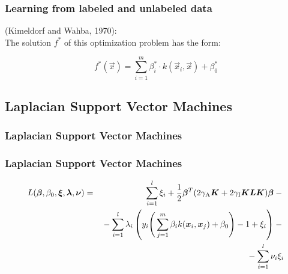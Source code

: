   
\begin{frame}
  \frametitle{Learning from labeled and unlabeled data \cont}
  
   (Kimeldorf and Wahba, 1970): \\[.3cm]
  
  The solution $f^*$ of this optimization problem has the form:

  \begin{displaymath}
    f^*(\vec{x}) = \sum_{i=1}^m \beta_i^* \cdot k(\vec{x}_i, \vec{x}) + \beta_0^*
  \end{displaymath}
\end{frame}


\subsection{Laplacian Support Vector Machines}

\begin{frame}
  \frametitle{Laplacian Support Vector Machines}
  
 
  \begin{center}
    \small
  \end{center}
\end{frame}


\begin{frame}
  \frametitle{Laplacian Support Vector Machines \cont}
  
  
  \begin{eqnarray*}
    L({\bm \beta},\beta_0,{\bm \xi},{\bm \lambda},{\bm \nu}) 
    &=& \sum_{i=1}^l \xi_i +
        \frac{1}{2} {\bm \beta}^T (2 \gamma_\text{A} {\bm K} + 2 \gamma_\text{I} {\bm K}{\bm L}{\bm K}) {\bm \beta} -{} \\
    & & {}- \sum_{i=1}^l \lambda_i \left(y_i \Bigg(\sum_{j=1}^m \beta_i k({\bm x}_i,{\bm x}_j) + \beta_0\Bigg) - 1 + \xi_i\right) -{} \\
    & & {}- \sum_{i=1}^l \nu_i \xi_i
  \end{eqnarray*}
\end{frame}


